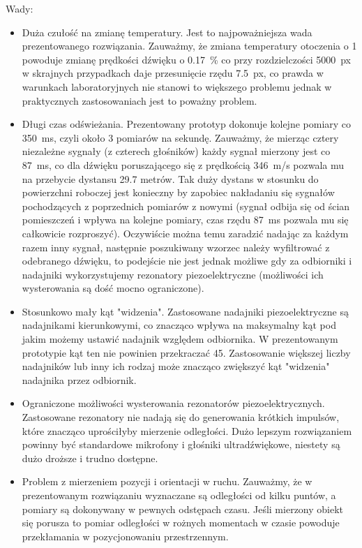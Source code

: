 Wady:
\begin{itemize}
 \item Duża czułość na zmianę temperatury. Jest to najpoważniejsza wada prezentowanego rozwiązania.
 Zauważmy, że zmiana temperatury otoczenia o \SI{1}{\degC} powoduje zmianę prędkości dźwięku o \SI{0,17}{\%} 
 co przy rozdzielczości \SI{5000}{px} w skrajnych przypadkach daje przesunięcie rzędu \SI{7.5}{px},
 co prawda w warunkach laboratoryjnych nie stanowi to większego problemu jednak w praktycznych zastosowaniach
 jest to poważny problem.
 
 \item Długi czas odświeżania. Prezentowany prototyp dokonuje kolejne pomiary co \SI{350}{ms}, czyli około 3 pomiarów 
 na sekundę. Zauważmy, że mierząc cztery niezależne sygnały (z czterech głośników) każdy sygnał mierzony jest co \SI{87}{ms},
 co dla dźwięku poruszającego się z prędkością \SI{346}{m/s} pozwala mu na przebycie dystansu 29.7 metrów.
 Tak duży dystans w stosunku do powierzchni roboczej jest konieczny by zapobiec nakładaniu się sygnałów pochodzących z poprzednich
 pomiarów z nowymi (sygnał odbija się od ścian pomieszczeń i wpływa na kolejne pomiary, czas rzędu \SI{87}{ms} pozwala mu
 się całkowicie rozproszyć).
 Oczywiście można temu zaradzić nadając za każdym razem inny sygnał, następnie poszukiwany wzorzec należy wyfiltrować z odebranego
 dźwięku, to podejście nie jest jednak możliwe gdy za odbiorniki i nadajniki wykorzystujemy rezonatory piezoelektryczne
 (możliwości ich wysterowania są dość mocno ograniczone).
 
 \item Stosunkowo mały kąt "widzenia". Zastosowane nadajniki piezoelektryczne są nadajnikami kierunkowymi, co 
 znacząco wpływa na maksymalny kąt pod jakim możemy ustawić nadajnik względem odbiornika. W prezentowanym 
 prototypie kąt ten nie powinien przekraczać \SI{45}{\deg}. Zastosowanie większej liczby nadajników lub inny ich rodzaj
 może znacząco zwiększyć kąt "widzenia" nadajnika przez odbiornik.

 \item Ograniczone możliwości wysterowania rezonatorów piezoelektrycznych. 
 Zastosowane rezonatory nie nadają się do generowania krótkich impulsów, które znacząco uprościłyby mierzenie odległości.
 Dużo lepszym rozwiązaniem powinny być standardowe mikrofony i głośniki ultradźwiękowe, niestety są dużo droższe 
 i trudno dostępne.
 
 \item Problem z mierzeniem pozycji i orientacji w ruchu. Zauważmy, że w prezentowanym rozwiązaniu wyznaczane są odległości od
 kilku puntów, a pomiary są dokonywany w pewnych odstępach czasu. Jeśli mierzony obiekt się porusza to pomiar odległości w rożnych
 momentach w czasie powoduje przekłamania w pozycjonowaniu przestrzennym.
 
\end{itemize}

